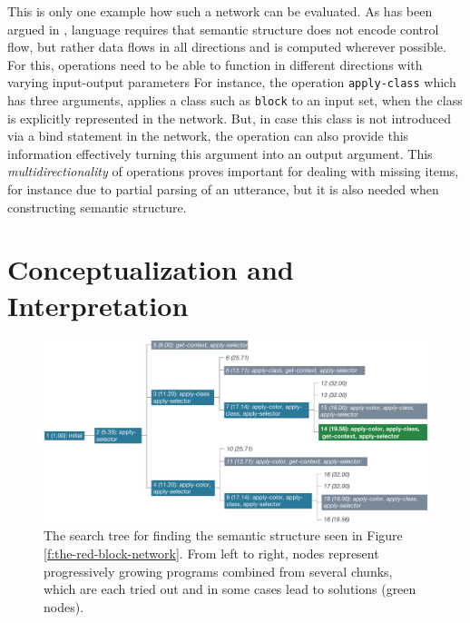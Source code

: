 This is only one example how such a network can be evaluated. 
As has been argued in \cite{steels2000emergence},
language requires that semantic structure does not encode control flow, but rather 
data flows in all directions and is computed wherever possible.
For this, operations need to be able to function in different directions with
varying input-output parameters
For instance, the operation {\footnotesize\tt apply-class} which has three arguments, 
applies a class such as {\footnotesize\tt block} to an input set, when the 
class is explicitly represented in the network. But, in case
this class is not introduced via a bind statement in the network, the operation
can also provide this information effectively turning this argument
into an output argument. This \emph{multidirectionality} of operations 
proves important for dealing with missing items, for instance due to partial parsing 
of an utterance, but it is also needed when constructing semantic structure.


\section{Conceptualization and Interpretation}
\begin{figure}
\center
\includegraphics[width=1.0\columnwidth]{figs/composition}
\caption[IRL conceptualization search tree]{The search tree 
for finding the semantic structure seen in 
Figure \ref{f:the-red-block-network}. From left to right, nodes 
represent progressively growing programs combined from 
several chunks, which are each tried out and in some cases 
lead to solutions (green nodes).}
\label{f:the-red-block-search-tree}
\end{figure}

